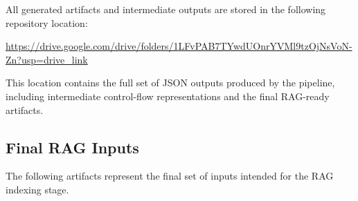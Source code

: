 \documentclass[11pt]{article}
\begin{document}
All generated artifacts and intermediate outputs are stored in the following repository location:

\begin{center}
\url{https://drive.google.com/drive/folders/1LFvPAB7TYwdUOnrYVMl9tzOjNsVoN-Zn?usp=drive_link}
\end{center}

This location contains the full set of JSON outputs produced by the pipeline, including intermediate control-flow representations and the final RAG-ready artifacts.

\subsection*{Final RAG Inputs}

The following artifacts represent the final set of inputs intended for the RAG indexing stage.
\end{document}
